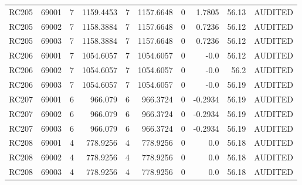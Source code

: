 \begin{tabular}{lrrrrrrrrr}
RC205 & 69001 & 7 & 1159.4453 & 7 & 1157.6648 & 0 & 1.7805 & 56.13 & AUDITED \\
RC205 & 69002 & 7 & 1158.3884 & 7 & 1157.6648 & 0 & 0.7236 & 56.12 & AUDITED \\
RC205 & 69003 & 7 & 1158.3884 & 7 & 1157.6648 & 0 & 0.7236 & 56.12 & AUDITED \\
RC206 & 69001 & 7 & 1054.6057 & 7 & 1054.6057 & 0 & -0.0 & 56.12 & AUDITED \\
RC206 & 69002 & 7 & 1054.6057 & 7 & 1054.6057 & 0 & -0.0 & 56.2 & AUDITED \\
RC206 & 69003 & 7 & 1054.6057 & 7 & 1054.6057 & 0 & -0.0 & 56.19 & AUDITED \\
RC207 & 69001 & 6 & 966.079 & 6 & 966.3724 & 0 & -0.2934 & 56.19 & AUDITED \\
RC207 & 69002 & 6 & 966.079 & 6 & 966.3724 & 0 & -0.2934 & 56.19 & AUDITED \\
RC207 & 69003 & 6 & 966.079 & 6 & 966.3724 & 0 & -0.2934 & 56.19 & AUDITED \\
RC208 & 69001 & 4 & 778.9256 & 4 & 778.9256 & 0 & 0.0 & 56.18 & AUDITED \\
RC208 & 69002 & 4 & 778.9256 & 4 & 778.9256 & 0 & 0.0 & 56.18 & AUDITED \\
RC208 & 69003 & 4 & 778.9256 & 4 & 778.9256 & 0 & 0.0 & 56.18 & AUDITED \\
\bottomrule
\end{tabular}
